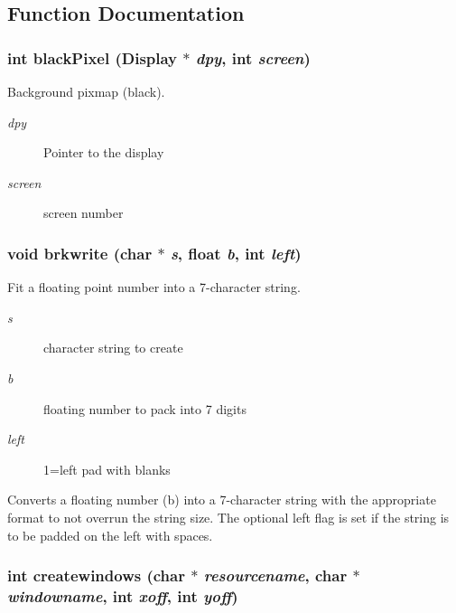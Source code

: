 \subsection{Function Documentation}
\subsubsection{\setlength{\rightskip}{0pt plus 5cm}int black\-Pixel (Display $\ast$ {\em dpy}, int {\em screen})}\label{xtvutils_8c_a222}


Background pixmap (black). 

\begin{Desc}
\item[Parameters:]
\begin{description}
\item[{\em dpy}]Pointer to the display \item[{\em screen}]screen number \end{description}
\end{Desc}
\subsubsection{\setlength{\rightskip}{0pt plus 5cm}void brkwrite (char $\ast$ {\em s}, float {\em b}, int {\em left})}\label{xtvutils_8c_a199}


Fit a floating point number into a 7-character string. 

\begin{Desc}
\item[Parameters:]
\begin{description}
\item[{\em s}]character string to create \item[{\em b}]floating number to pack into 7 digits \item[{\em left}]1=left pad with blanks\end{description}
\end{Desc}
Converts a floating number (b) into a 7-character string with the appropriate format to not overrun the string size. The optional left flag is set if the string is to be padded on the left with spaces. 
\subsubsection{\setlength{\rightskip}{0pt plus 5cm}int createwindows (char $\ast$ {\em resourcename}, char $\ast$ {\em windowname}, int {\em xoff}, int {\em yoff})}\label{xtvutils_8c_a166}



